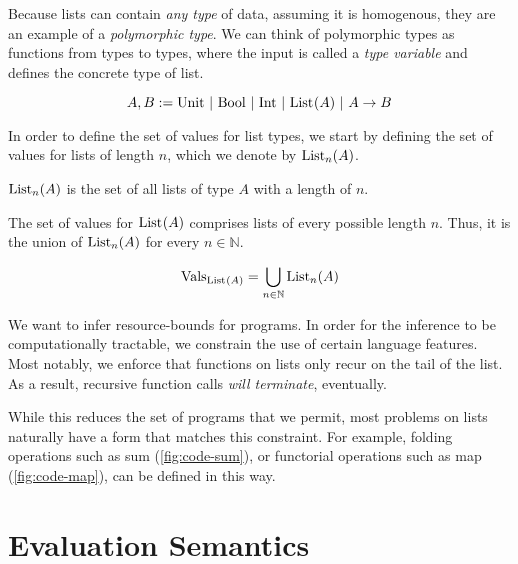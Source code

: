 Because lists can contain \emph{any type} of data, assuming it is homogenous, they are an example of a \emph{polymorphic type}. We can think of polymorphic types as functions from types to types, where the input is called a \emph{type variable} and defines the concrete type of list. 

\begin{definition}\label{def:type-system-6}
   \[
      A, B := \text{Unit}~|~\text{\text{Bool}}~|~\text{\text{Int}}~|~\text{List}^{}(A)~|~A \to B ^{}_{}
   \]
\end{definition}

In order to define the set of values for list types, we start by defining the set of values for lists of length \(n\), which we denote by \(\text{List}_{n}(A)\). 

\begin{definition}\label{def:lists-of-length-n}
   \(\text{List}_{n}(A)\) is the set of all lists of type \(A\) with a length of \(n\).
\end{definition}

The set of values for \(\text{List}^{}(A)\) comprises lists of every possible length \(n\). Thus, it is the union of \(\text{List}_{n}(A)\) for every \(n \in \mathbb{N}\). 

\begin{definition}
   \begin{displaymath}
      \text{Vals}_{\text{List}^{}(A)} = \bigcup_{n \in \mathbb{N}} \text{List}_{n}(A)
   \end{displaymath}
\end{definition}


We want to infer resource-bounds for programs. In order for the inference to be computationally tractable, we constrain the use of certain language features. Most notably, we enforce that functions on lists only recur on the tail of the list. As a result, recursive function calls \emph{will terminate}, eventually.

While this reduces the set of programs that we permit, most problems on lists naturally have a form that matches this constraint. For example, folding operations such as sum (\cref{fig:code-sum}), or functorial operations such as map (\cref{fig:code-map}), can be defined in this way. 


\section{Evaluation Semantics}

